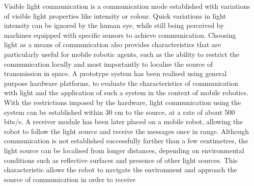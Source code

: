 Visible light communication is a communication mode established with variations of visible light properties like intensity or colour. 
Quick variations in light intensity can be ignored by the human eye, while still being perceived by machines equipped with specific sensors to achieve communication.
Choosing light as a means of communication also provides characteristics that are particularly useful for mobile robotic agents, such as the ability to restrict the communication locally and most importantly to localise the source of transmission in space.
A prototype system has been realised using general purpose hardware platforms, to evaluate the characteristics of communication with light and the application of such a system in the context of mobile robotics.
With the restrictions imposed by the hardware, light communication using the system can be established within 30 cm to the source, at a rate of about 500 bits/s.
A receiver module has been later placed on a mobile robot, allowing the robot to follow the light source and receive the messages once in range.
Although communication is not established successfully farther than a few centimetres, the light source can be localised from longer distances, depending on environmental conditions such as reflective surfaces and presence of other light sources.
This characteristic allows the robot to navigate the environment and approach the source of communication in order to receive 